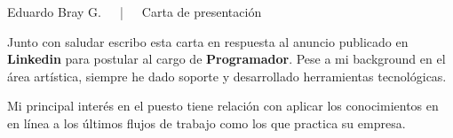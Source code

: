 \documentclass[12pt, a4paper]{awesome-cv}
\begin{document}
\makecvheader[R]

\makecvfooter
{}
{Eduardo Bray G.~~~|~~~Carta de presentación}
{}

\makelettertitle

\begin{cvletter}

	Junto con saludar escribo esta carta en respuesta al anuncio publicado en
	\textbf{Linkedin} para postular al cargo de \textbf{Programador}. Pese a mi
	background en el área artística, siempre he dado soporte y desarrollado
	herramientas tecnológicas.

	Mi principal interés en el puesto tiene relación con aplicar los conocimientos
	en  en línea a los últimos flujos de trabajo como los que practica su
	empresa.

\end{cvletter}


\end{document}
